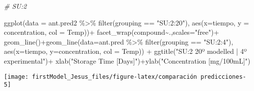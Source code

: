 \documentclass[
]{article}
\newenvironment{Shaded}{\begin{snugshade}}{\end{snugshade}}
\newcommand{\AttributeTok}[1]{\textcolor[rgb]{0.77,0.63,0.00}{#1}}
\newcommand{\CommentTok}[1]{\textcolor[rgb]{0.56,0.35,0.01}{\textit{#1}}}
\newcommand{\FunctionTok}[1]{\textcolor[rgb]{0.00,0.00,0.00}{#1}}
\newcommand{\NormalTok}[1]{#1}
\newcommand{\SpecialCharTok}[1]{\textcolor[rgb]{0.00,0.00,0.00}{#1}}
\newcommand{\StringTok}[1]{\textcolor[rgb]{0.31,0.60,0.02}{#1}}
\begin{document}
\begin{Shaded}
\begin{Highlighting}[]
\CommentTok{\# SU:2}

\FunctionTok{ggplot}\NormalTok{(}\AttributeTok{data =}\NormalTok{ ant.pred2 }\SpecialCharTok{\%\textgreater{}\%} \FunctionTok{filter}\NormalTok{(grouping }\SpecialCharTok{==} \StringTok{"SU:2:20"}\NormalTok{), }\FunctionTok{aes}\NormalTok{(}\AttributeTok{x=}\NormalTok{tiempo, }\AttributeTok{y =}\NormalTok{ concentration, }\AttributeTok{col =}\NormalTok{ Temp))}\SpecialCharTok{+}
  \FunctionTok{facet\_wrap}\NormalTok{(compound}\SpecialCharTok{\textasciitilde{}}\NormalTok{.,}\AttributeTok{scales=}\StringTok{"free"}\NormalTok{)}\SpecialCharTok{+}
  \FunctionTok{geom\_line}\NormalTok{()}\SpecialCharTok{+}\FunctionTok{geom\_line}\NormalTok{(}\AttributeTok{data=}\NormalTok{ant.pred }\SpecialCharTok{\%\textgreater{}\%} \FunctionTok{filter}\NormalTok{(grouping }\SpecialCharTok{==} \StringTok{"SU:2:4"}\NormalTok{), }\FunctionTok{aes}\NormalTok{(}\AttributeTok{x=}\NormalTok{tiempo, }\AttributeTok{y=}\NormalTok{concentration, }\AttributeTok{col =}\NormalTok{ Temp)) }\SpecialCharTok{+}
  \FunctionTok{ggtitle}\NormalTok{(}\StringTok{"SU:2 20º modelled | 4º experimental"}\NormalTok{)}\SpecialCharTok{+} \FunctionTok{xlab}\NormalTok{(}\StringTok{"Storage Time [Days]"}\NormalTok{)}\SpecialCharTok{+}\FunctionTok{ylab}\NormalTok{(}\StringTok{"Concentration [mg/100mL]"}\NormalTok{)}
\end{Highlighting}
\end{Shaded}

\begin{center}\texttt{[image: firstModel\_Jesus\_files/figure-latex/comparación predicciones-5]} \end{center}
\end{document}
